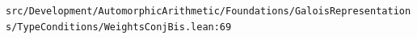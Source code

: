 \nolinkurl{src/Development/AutomorphicArithmetic/Foundations/GaloisRepresentations/TypeConditions/WeightsConjBis.lean:69}%
